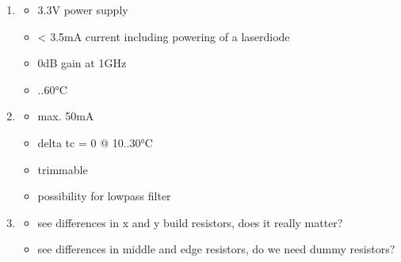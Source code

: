 \documentclass[letterpaper,10pt,english]{sphinxmanual}
\begin{document}
\begin{enumerate}
\item {} \begin{description}
\begin{itemize}
\item {} 
\sphinxAtStartPar
3.3V power supply

\item {} 
\sphinxAtStartPar
\textless{} 3.5mA current including powering of a laser\sphinxhyphen{}diode

\item {} 
\sphinxAtStartPar
0dB gain at 1GHz

\item {} 
..60°C

\end{itemize}

\end{description}

\item {} \begin{description}
\begin{itemize}
\item {} 
\sphinxAtStartPar
max. 50mA

\item {} 
\sphinxAtStartPar
delta tc = 0 @ 10..30°C

\item {} 
\sphinxAtStartPar
trimmable

\item {} 
\sphinxAtStartPar
possibility for lowpass filter

\end{itemize}

\end{description}

\item {} \begin{description}
\begin{itemize}
\item {} 
\sphinxAtStartPar
see differences in x and y build resistors, does it really matter?

\item {} 
\sphinxAtStartPar
see differences in middle and edge resistors, do we need dummy resistors?

\end{itemize}

\end{description}


\end{enumerate}
\end{document}
